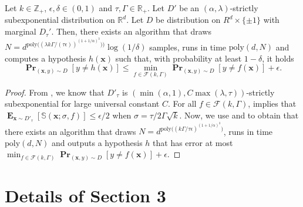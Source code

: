 \documentclass{theoretics}
\renewcommand\vec[1]{\mathbf{#1}}
\DeclareMathOperator*{\pr}{\mathbf{Pr}}
\DeclareMathOperator*{\E}{\mathbf{E}}
\newcommand{\R}{\mathbb{R}}
\newcommand{\poly}{\mathrm{poly}}
\newcommand{\1}{\Ind}
\newcommand{\x}{\vec x}
\newcommand{\F}{\mathcal{F}}
\begin{document}
\begin{theorem}
\label{corollary: agnostic_smoothed_subexp}
Let $k\in \mathbb{Z}_{+}$, $\epsilon,\delta\in (0,1)$ and $\tau,\Gamma\in \R_{+}$. Let $D'$ be an $(\alpha,\lambda)$-strictly subexponential distribution on $\R^d$. Let $D$ be distribution on $R^{d}\times \{\pm 1\}$ with marginal ${D}_{\tau}'$. Then, there exists an algorithm that draws $N=d^{\poly\bigl((\lambda k\Gamma/(\tau\epsilon))^{(1+1/\alpha)^3})\bigr)}\log(1/\delta)$ samples, runs in time $\poly(d,N)$ and computes a hypothesis $h(\x)$ such that, with probability at least $1-\delta$, it holds
\[
    \pr_{(\x,y)\sim D}[y\neq h(\x)]\leq \min_{f\in \F(k,\Gamma)}\pr_{(\x,y)\sim D}[y\neq f(\x)]+\epsilon.
\]
    
\end{theorem}
\begin{proof}
    From , we know that $D'_{\tau}$ is $(\min(\alpha,1), C\max(\lambda,\tau))$-strictly subexponential for large universal constant $C$. For all $f\in \F(k,\Gamma)$,  implies that $\E_{\x\sim D'_{\tau}}[\mathbb{S}(\x;\sigma,f)]\leq \epsilon/2$ when $\sigma=\tau/2\Gamma\sqrt{k}$. Now, we use  and  to obtain that there exists an algorithm that draws $N=d^{\poly\bigl((k\Gamma/\tau\epsilon)^{(1+1/\alpha)^3}\bigr)}$, runs in time $\poly(d,N)$ and outputs a hypothesis $h$ that has error at most $\min_{f\in \F(k,\Gamma)}\pr_{(\x,y)\sim D}[y\neq f(\x)]+\epsilon$.
 \end{proof}

\section{Details of Section 3}
\end{document}
